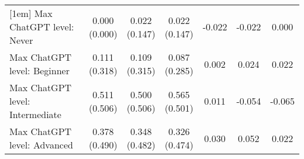 \begin{table}[ht]
{\begin{tabular}{lcccccc}
[1em]
Max ChatGPT level: Never & \shortstack{0.000\\(0.000)} & \shortstack{0.022\\(0.147)} & \shortstack{0.022\\(0.147)} & \shortstack{-0.022\\\relax[0.325]} & \shortstack{-0.022\\\relax[0.325]} & \shortstack{0.000\\\relax[1.000]}\\
[1em]
Max ChatGPT level: Beginner & \shortstack{0.111\\(0.318)} & \shortstack{0.109\\(0.315)} & \shortstack{0.087\\(0.285)} & \shortstack{0.002\\\relax[0.971]} & \shortstack{0.024\\\relax[0.703]} & \shortstack{0.022\\\relax[0.729]}\\
[1em]
Max ChatGPT level: Intermediate & \shortstack{0.511\\(0.506)} & \shortstack{0.500\\(0.506)} & \shortstack{0.565\\(0.501)} & \shortstack{0.011\\\relax[0.917]} & \shortstack{-0.054\\\relax[0.609]} & \shortstack{-0.065\\\relax[0.536]}\\
[1em]
Max ChatGPT level: Advanced & \shortstack{0.378\\(0.490)} & \shortstack{0.348\\(0.482)} & \shortstack{0.326\\(0.474)} & \shortstack{0.030\\\relax[0.769]} & \shortstack{0.052\\\relax[0.610]} & \shortstack{0.022\\\relax[0.828]}\\
\bottomrule
\end{tabular} }
  \end{table}